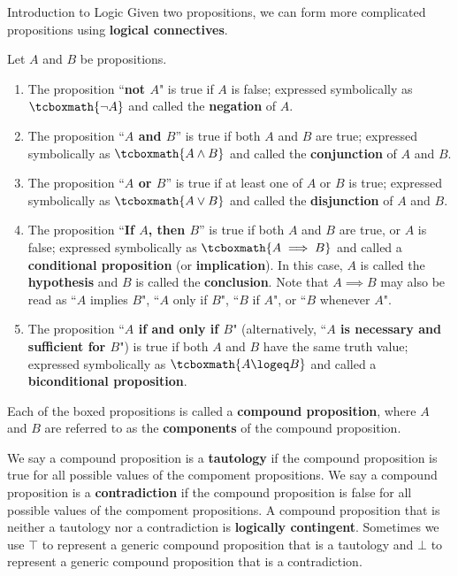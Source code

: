 \begin{section}{Introduction to Logic}
Given two propositions, we can form more complicated propositions using \textbf{logical connectives}.

\begin{definition}\label{def:logical connectives}
Let $A$ and $B$ be propositions.  
\begin{enumerate}[label=\textrm{(\alph*)}]
\item The proposition ``\textbf{not $A$}" is true if $A$ is false; expressed symbolically as 
$\tcboxmath{\neg A}$ and called the \textbf{negation} of $A$.
\item The proposition ``\textbf{$A$ and $B$}'' is true if both $A$ and $B$ are true; expressed symbolically as $\tcboxmath{A \wedge B}$ and called the \textbf{conjunction} of $A$ and $B$.
\item The proposition ``\textbf{$A$ or $B$}'' is true if at least one of $A$ or $B$ is true; expressed symbolically as $\tcboxmath{A \vee B}$ and called the \textbf{disjunction} of $A$ and $B$.
\item\label{def:conditional} The proposition ``\textbf{If $A$, then
    $B$}'' is true if both $A$ and $B$ are true, or $A$ is false;
  expressed symbolically as $\tcboxmath{A \implies B}$ and called a
  \textbf{conditional proposition} (or \textbf{implication}). In this
  case, $A$ is called the \textbf{hypothesis} and $B$ is called the
  \textbf{conclusion}. Note that $A \implies B$ may also be read as
  ``$A$ implies $B$", ``$A$ only if $B$", ``$B$ if $A$", or ``$B$
  whenever $A$".
\item The proposition ``\textbf{$A$ if and only if $B$}" (alternatively, ``\textbf{$A$ is necessary and sufficient for $B$}") is true if both $A$ and $B$ have the same truth value; expressed symbolically as $\tcboxmath{A\logeq B}$ and called a \textbf{biconditional proposition}. 
\end{enumerate}
Each of the boxed propositions is called a \textbf{compound proposition}, where $A$ and $B$ are referred to as the \textbf{components} of the compound proposition.
\end{definition}

\begin{definition}
  We say a compound proposition is a \textbf{tautology} if the
  compound proposition is true for all possible values of the
  compoment propositions.  We say a compound proposition is a
  \textbf{contradiction} if the compound proposition is false for all
  possible values of the compoment propositions. A compound
  proposition that is neither a tautology nor a contradiction is
  \textbf{logically contingent}. Sometimes we use $\top$ to represent
  a generic compound proposition that is a tautology and $\bot$ to
  represent a generic compound proposition that is a contradiction.
\end{definition}


\end{section}
